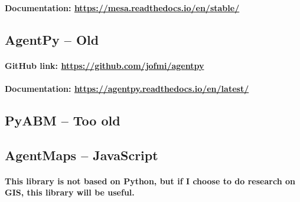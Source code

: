 \documentclass{article}
\begin{document}
\paragraph{Documentation: \href{https://mesa.readthedocs.io/en/stable/}{https://mesa.readthedocs.io/en/stable/}}
% 
% 
% 
% 
% 
% 
\subsection{AgentPy -- Old}
\paragraph{GitHub link: \href{https://github.com/jofmi/agentpy}{https://github.com/jofmi/agentpy}}
\paragraph{Documentation: \href{https://agentpy.readthedocs.io/en/latest/}{https://agentpy.readthedocs.io/en/latest/}}
% 
% 
% 
% 
\subsection{PyABM -- Too old}
\subsection{AgentMaps -- JavaScript}
% 
\paragraph{This library is not based on Python, but if I choose to do research on GIS, this library will be useful.}
% 
% 
% 
% 
\end{document}
